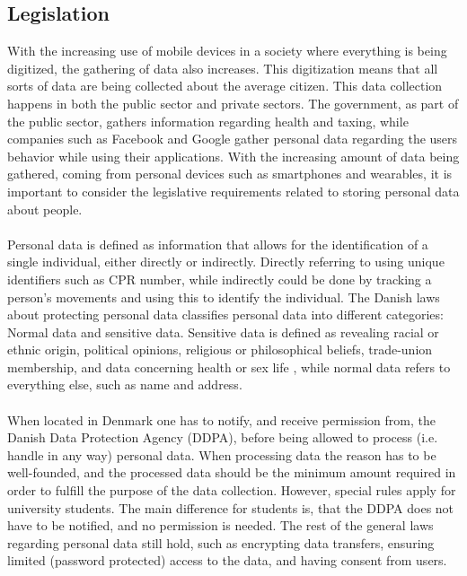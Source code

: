 
\subsection{Legislation}
\label{sub:legislation}

With the increasing use of mobile devices in a society where everything is being digitized, the gathering of data also increases. This digitization means that all sorts of data are being collected about the average citizen. This data collection happens in both the public sector and private sectors. The government, as part of the public sector, gathers information regarding health and taxing, while companies such as Facebook and Google gather personal data regarding the users behavior while using their applications. With the increasing amount of data being gathered, coming from personal devices such as smartphones and wearables, it is important to consider the legislative requirements related to storing personal data about people.
\\\\
Personal data is defined as information that allows for the identification of a single individual, either directly or indirectly. Directly referring to using unique identifiers such as CPR number, while indirectly could be done by tracking a person's movements and using this to identify the individual. The Danish laws about protecting personal data classifies personal data into different categories: Normal data and sensitive data. Sensitive data is defined as revealing racial or ethnic origin, political opinions, religious or philosophical beliefs, trade-union membership, and data concerning health or sex life \parencite{datatilsynet_stud1}, while normal data refers to everything else, such as name and address.  
\\\\
When located in Denmark one has to notify, and receive permission from, the Danish Data Protection Agency (DDPA), before being allowed to process (i.e. handle in any way) personal data. When processing data the reason has to be well-founded, and the processed data should be the minimum amount required in order to fulfill the purpose of the data collection. However, special rules apply for university students. The main difference for students is, that the DDPA does not have to be notified, and no permission is needed. The rest of the general laws regarding personal data still hold, such as encrypting data transfers, ensuring limited (password protected) access to the data, and having consent from  users. 
